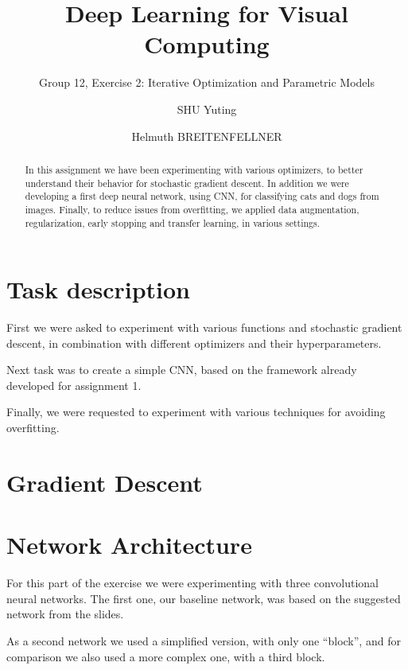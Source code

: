 \documentclass[sigconf,nonacm]{acmart}
\begin{document}
\title{Deep Learning for Visual Computing}
\subtitle{Group 12, Exercise 2: Iterative Optimization and Parametric Models}
\author{SHU Yuting}
\author{Helmuth BREITENFELLNER}
\begin{abstract}
In this assignment we have been experimenting with various optimizers,
to better understand their behavior for stochastic gradient
descent.
In addition we were developing a first deep neural network, using CNN,
for classifying cats and dogs from images.
Finally, to reduce issues from overfitting, we applied data augmentation,
regularization, early stopping and transfer learning, in various settings.
\end{abstract}
\maketitle
\section{Task description}
First we were asked to experiment with various functions and stochastic
gradient descent, in combination with different optimizers and
their hyperparameters.

Next task was to create a simple CNN, based on the framework already developed
for assignment 1.

Finally, we were requested to experiment with various techniques for avoiding overfitting.

\section{Gradient Descent}

\section{Network Architecture}

For this part of the exercise we were experimenting with three convolutional neural networks.
The first one, our baseline network, was based on the suggested network from the slides.

As a second network we used a simplified version, with only one ``block'', and for comparison
we also used a more complex one, with a third block.
\end{document}
